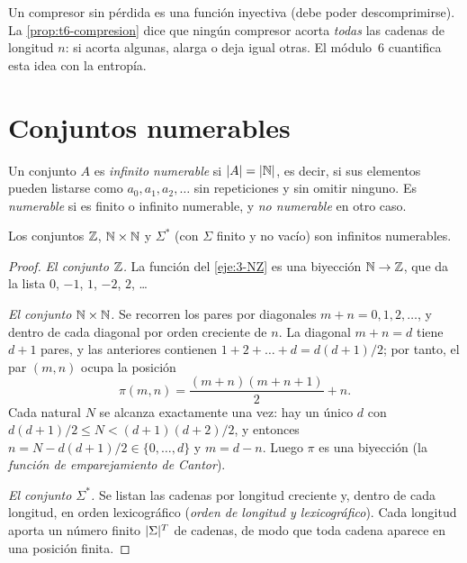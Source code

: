 Un compresor sin pérdida es una función inyectiva (debe poder descomprimirse). La \cref{prop:t6-compresion} dice que ningún compresor acorta \emph{todas} las cadenas de longitud $n$: si acorta algunas, alarga o deja igual otras. El módulo~6 cuantifica esta idea con la entropía.

\section{Conjuntos numerables}

\begin{definicion}[Numerable]
Un conjunto $A$ es \emph{infinito numerable} si $\lvert A\rvert=\lvert\mathbb{N}\rvert$, es decir, si sus elementos pueden listarse como $a_0,a_1,a_2,\dots$ sin repeticiones y sin omitir ninguno. Es \emph{numerable} si es finito o infinito numerable, y \emph{no numerable} en otro caso.
\end{definicion}

\begin{proposicion}\label{prop:t6-numerables}
Los conjuntos $\mathbb{Z}$, $\mathbb{N}\times\mathbb{N}$ y $\Sigma^{*}$ (con $\Sigma$ finito y no vacío) son infinitos numerables.
\end{proposicion}

\begin{proof}
\emph{El conjunto $\mathbb{Z}$.} La función del \cref{eje:3-NZ} es una biyección $\mathbb{N}\to\mathbb{Z}$, que da la lista $0$, $-1$, $1$, $-2$, $2$, \dots

\emph{El conjunto $\mathbb{N}\times\mathbb{N}$.} Se recorren los pares por diagonales $m+n=0,1,2,\dots$, y dentro de cada diagonal por orden creciente de $n$. La diagonal $m+n=d$ tiene $d+1$ pares, y las anteriores contienen $1+2+\dots+d=d(d+1)/2$; por tanto, el par $(m,n)$ ocupa la posición
\[
\pi(m,n)=\frac{(m+n)(m+n+1)}{2}+n.
\]
Cada natural $N$ se alcanza exactamente una vez: hay un único $d$ con $d(d+1)/2\le N<(d+1)(d+2)/2$, y entonces $n=N-d(d+1)/2\in\{0,\dots,d\}$ y $m=d-n$. Luego $\pi$ es una biyección (la \emph{función de emparejamiento de Cantor}).

\emph{El conjunto $\Sigma^{*}$.} Se listan las cadenas por longitud creciente y, dentro de cada longitud, en orden lexicográfico (\emph{orden de longitud y lexicográfico}). Cada longitud aporta un número finito $\lvert\Sigma\rvert^{T}$ de cadenas, de modo que toda cadena aparece en una posición finita.
\end{proof}

